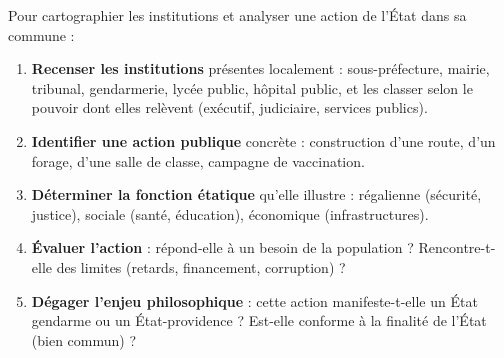 \documentclass[11pt]{article}
\begin{document}
\begin{methode}
Pour cartographier les institutions et analyser une action de l'État dans sa commune :
\begin{enumerate}
\item \textbf{Recenser les institutions} présentes localement : sous-préfecture, mairie, tribunal, gendarmerie, lycée public, hôpital public, et les classer selon le pouvoir dont elles relèvent (exécutif, judiciaire, services publics).
\item \textbf{Identifier une action publique} concrète : construction d'une route, d'un forage, d'une salle de classe, campagne de vaccination.
\item \textbf{Déterminer la fonction étatique} qu'elle illustre : régalienne (sécurité, justice), sociale (santé, éducation), économique (infrastructures).
\item \textbf{Évaluer l'action} : répond-elle à un besoin de la population ? Rencontre-t-elle des limites (retards, financement, corruption) ?
\item \textbf{Dégager l'enjeu philosophique} : cette action manifeste-t-elle un État gendarme ou un État-providence ? Est-elle conforme à la finalité de l'État (bien commun) ?
\end{enumerate}
\end{methode}
\end{document}
